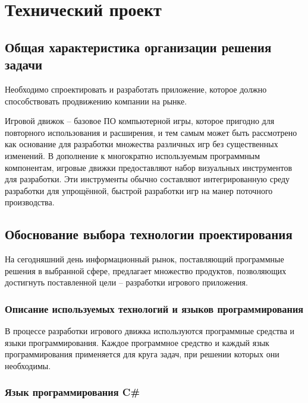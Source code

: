 \section{Технический проект}
\subsection{Общая характеристика организации решения задачи}

Необходимо спроектировать и разработать приложение, которое должно способствовать продвижению компании на рынке.

Игровой движок -- базовое ПО компьютерной игры, которое пригодно для повторного использования и расширения, и тем самым может быть рассмотрено как основание для разработки множества различных игр без существенных изменений. В дополнение к многократно используемым программным компонентам, игровые движки предоставляют набор визуальных инструментов для разработки. Эти инструменты обычно составляют интегрированную среду разработки для упрощённой, быстрой разработки игр на манер поточного производства.

\subsection{Обоснование выбора технологии проектирования}

На сегодняшний день информационный рынок, поставляющий программные решения в выбранной сфере, предлагает множество продуктов, позволяющих достигнуть поставленной цели – разработки игрового приложения.

\subsubsection{Описание используемых технологий и языков программирования}

В процессе разработки игрового движка используются программные средства и языки программирования. Каждое программное средство и каждый язык программирования применяется для круга задач, при решении которых они необходимы.

\subsubsection{Язык программирования C\#}

